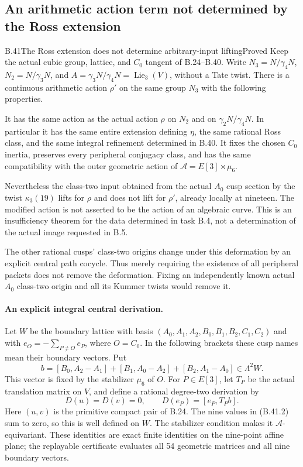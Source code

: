 \subsection{An arithmetic action term not determined by the Ross extension}

\begin{statement}{B.41}{The Ross extension does not determine arbitrary-input lifting}{Proved}
Keep the actual cubic group, lattice, and $C_0$ tangent of B.24--B.40.
Write $N_3=N/\gamma_4N$, $N_2=N/\gamma_3N$, and
$A=\gamma_3N/\gamma_4N=\operatorname{Lie}_3(V)$, without a Tate twist.
There is a continuous arithmetic action $\rho'$ on the same group
$N_3$ with the following properties.

It has the same action as the actual action $\rho$ on $N_2$ and on
$\gamma_2N/\gamma_4N$.  In particular it has the same entire
extension defining $\eta$, the same rational Ross class, and the
same integral refinement determined in B.40.  It fixes the chosen
$C_0$ inertia, preserves every peripheral conjugacy class, and has
the same compatibility with the outer geometric action of
$\mathcal A=E[3]\rtimes\mu_6$.

Nevertheless the class-two input obtained from the actual $A_0$
cusp section by the twist $\kappa_3(19)$ lifts for $\rho$ and does
not lift for $\rho'$, already locally at nineteen.  The modified
action is not asserted to be the action of an algebraic curve.
This is an insufficiency theorem for the data determined in task
B.4, not a determination of the actual image requested in B.5.

The other rational cusps' class-two origins change under this
deformation by an explicit central path cocycle.  Thus merely
requiring the existence of all peripheral packets does not remove
the deformation.  Fixing an independently known actual $A_0$
class-two origin and all its Kummer twists would remove it.
\end{statement}

\paragraph{An explicit integral central derivation.}
Let $W$ be the boundary lattice with basis
$(A_0,A_1,A_2,B_0,B_1,B_2,C_1,C_2)$ and with
$e_O=-\sum_{P\ne O}e_P$, where $O=C_0$.  In the following
brackets these cusp names mean their boundary vectors.  Put
\[
 b=[B_0,A_2-A_1]+[B_1,A_0-A_2]+[B_2,A_1-A_0]
       \in\Lambda^2W.                                      \tag{B.41.1}
\]
This vector is fixed by the stabilizer $\mu_6$ of $O$.
For $P\in E[3]$, let $T_P$ be the actual translation matrix on
$V$, and define a rational degree-two derivation by
\[
 D(u)=D(v)=0,\qquad D(e_P)=[e_P,T_Pb].                       \tag{B.41.2}
\]
Here $(u,v)$ is the primitive compact pair of B.24.  The nine
values in (B.41.2) sum to zero, so this is well defined on $W$.
The stabilizer condition makes it $\mathcal A$-equivariant.
These identities are exact finite identities on the nine-point
affine plane; the replayable certificate evaluates all 54
geometric matrices and all nine boundary vectors.

